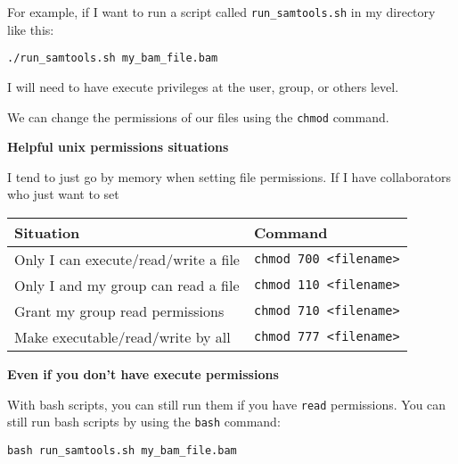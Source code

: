 \documentclass[
  letterpaper,
  DIV=11,
  numbers=noendperiod]{scrreprt}
\begin{document}
For example, if I want to run a script called \texttt{run\_samtools.sh}
in my directory like this:

\begin{verbatim}
./run_samtools.sh my_bam_file.bam
\end{verbatim}

I will need to have execute privileges at the user, group, or others
level.

We can change the permissions of our files using the \texttt{chmod}
command.

\begin{tcolorbox}[enhanced jigsaw, breakable, leftrule=.75mm, colframe=quarto-callout-color-frame, left=2mm, toprule=.15mm, arc=.35mm, rightrule=.15mm, opacityback=0, bottomrule=.15mm, colback=white]

\vspace{-3mm}\textbf{Helpful unix permissions situations}\vspace{3mm}

I tend to just go by memory when setting file permissions. If I have
collaborators who just want to set

\begin{longtable}[]{@{}ll@{}}
\toprule\noalign{}
Situation & Command \\
\midrule\noalign{}
\endhead
\bottomrule\noalign{}
\endlastfoot
Only I can execute/read/write a file &
\texttt{chmod\ 700\ \textless{}filename\textgreater{}} \\
Only I and my group can read a file &
\texttt{chmod\ 110\ \textless{}filename\textgreater{}} \\
Grant my group read permissions &
\texttt{chmod\ 710\ \textless{}filename\textgreater{}} \\
Make executable/read/write by all &
\texttt{chmod\ 777\ \textless{}filename\textgreater{}} \\
\end{longtable}

\end{tcolorbox}

\begin{tcolorbox}[enhanced jigsaw, breakable, leftrule=.75mm, colframe=quarto-callout-color-frame, left=2mm, toprule=.15mm, arc=.35mm, rightrule=.15mm, opacityback=0, bottomrule=.15mm, colback=white]

\vspace{-3mm}\textbf{Even if you don't have execute permissions}\vspace{3mm}

With bash scripts, you can still run them if you have \texttt{read}
permissions. You can still run bash scripts by using the \texttt{bash}
command:

\begin{verbatim}
bash run_samtools.sh my_bam_file.bam
\end{verbatim}

\end{tcolorbox}
\end{document}
